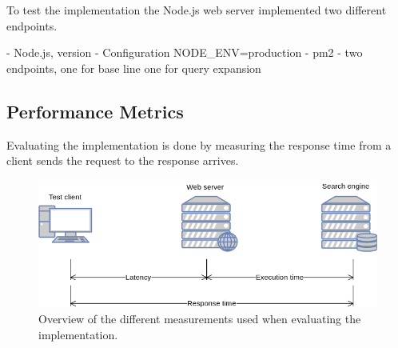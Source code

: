 To test the implementation the Node.js web server implemented two different endpoints.

- Node.js, version
- Configuration NODE\_ENV=production
- pm2
- two endpoints, one for base line one for query expansion



\subsection{Performance Metrics}
Evaluating the implementation is done by measuring the response time from a client sends the request to the response arrives.


\begin{figure}[h!]
  \centering \includegraphics[width=0.9\linewidth]{img/latency-measurements.png}
  \caption{Overview of the different measurements used when evaluating the implementation.}
  \label{fig:latency-measurements}
\end{figure}
